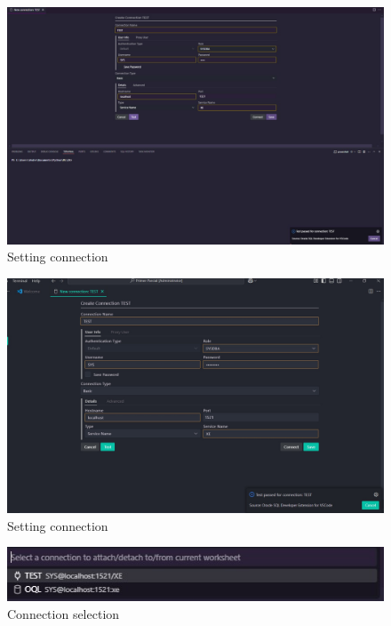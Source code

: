 \documentclass{article}
\begin{document}
\begin{figure}[H]
	\centering
	\includegraphics[width=1\textwidth]{imgs/setConn.jpeg}
	\caption{Setting connection}
	\label{fig:3}
\end{figure}

\begin{figure}[H]
	\centering
	\includegraphics[width=1\textwidth]{imgs/setConn2.jpeg}
	\caption{Setting connection}
	\label{fig:4}
\end{figure}

\begin{figure}[H]
	\centering
	\includegraphics[width=1\textwidth]{imgs/selConn.jpeg}
	\caption{Connection selection}
	\label{fig:5}
\end{figure}
\end{document}

